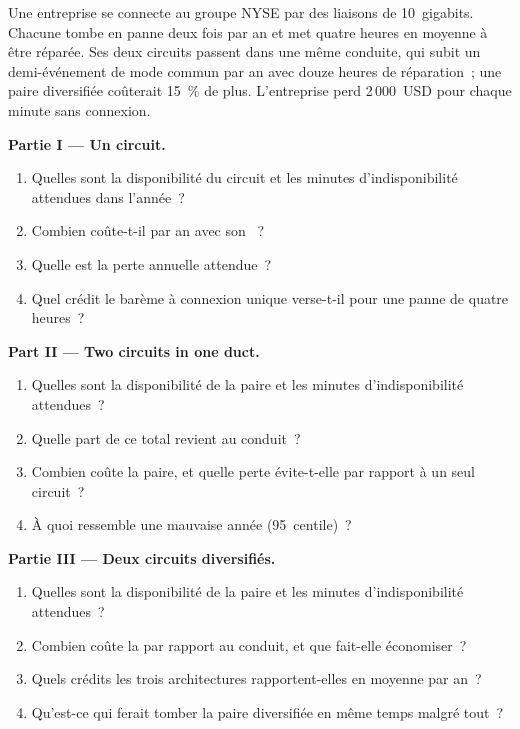 \begin{problem}\label{pb:nw:buying-connectivity:1}
Une entreprise se connecte au groupe NYSE par des liaisons de 10~gigabits. Chacune tombe en panne deux fois par an et met quatre heures en moyenne à être réparée. Ses
deux circuits passent dans une même conduite, qui subit un demi-événement de mode commun par an avec douze heures de réparation~; une paire diversifiée coûterait 15~\% de plus. L'entreprise
perd 2\,000~USD pour chaque minute sans connexion.

\medskip\noindent\textbf{Partie I --- Un circuit.}
\begin{enumerate}
\item Quelles sont la disponibilité du circuit et les minutes d'indisponibilité attendues dans l'année~?
\item Combien coûte-t-il par an avec son ~?
\item Quelle est la perte annuelle attendue~?
\item Quel crédit le barème à connexion unique verse-t-il pour une panne de quatre heures~?
\end{enumerate}

\medskip\noindent\textbf{Part II --- Two circuits in one duct.}
\begin{enumerate}[resume]
\item Quelles sont la disponibilité de la paire et les minutes d'indisponibilité attendues~?
\item Quelle part de ce total revient au conduit~?
\item Combien coûte la paire, et quelle perte évite-t-elle par rapport à un seul circuit~?
\item À quoi ressemble une mauvaise année (95~centile)~?
\end{enumerate}

\medskip\noindent\textbf{Partie III --- Deux circuits diversifiés.}
\begin{enumerate}[resume]
\item Quelles sont la disponibilité de la paire et les minutes d'indisponibilité attendues~?
\item Combien coûte la  par rapport au conduit, et que fait-elle économiser~?
\item Quels crédits les trois architectures rapportent-elles en moyenne par an~?
\item Qu'est-ce qui ferait tomber la paire diversifiée en même temps malgré tout~?
\end{enumerate}


\end{problem}
